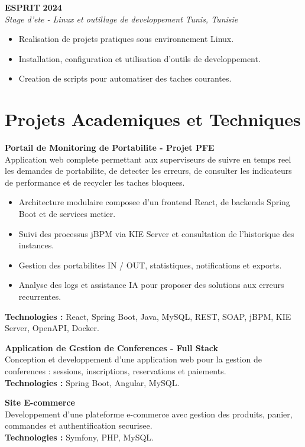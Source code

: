\documentclass[10pt,a4paper]{article}
\newcommand{\entry}[4]{
    \textbf{#1} \hfill \textbf{#2}\\
    \textit{#3} \hfill \textit{#4}\\
}
\begin{document}
\vspace{4pt}
\entry{ESPRIT}{2024}
{Stage d'ete - Linux et outillage de developpement}{Tunis, Tunisie}
\begin{itemize}
    \item Realisation de projets pratiques sous environnement Linux.
    \item Installation, configuration et utilisation d'outils de developpement.
    \item Creation de scripts pour automatiser des taches courantes.
\end{itemize}

\section*{Projets Academiques et Techniques}
\textbf{Portail de Monitoring de Portabilite - Projet PFE}\\
Application web complete permettant aux superviseurs de suivre en temps reel les demandes de portabilite, de detecter les erreurs, de consulter les indicateurs de performance et de recycler les taches bloquees.
\begin{itemize}
    \item Architecture modulaire composee d'un frontend React, de backends Spring Boot et de services metier.
    \item Suivi des processus jBPM via KIE Server et consultation de l'historique des instances.
    \item Gestion des portabilites IN / OUT, statistiques, notifications et exports.
    \item Analyse des logs et assistance IA pour proposer des solutions aux erreurs recurrentes.
\end{itemize}
\textbf{Technologies :} React, Spring Boot, Java, MySQL, REST, SOAP, jBPM, KIE Server, OpenAPI, Docker.

\vspace{4pt}
\textbf{Application de Gestion de Conferences - Full Stack}\\
Conception et developpement d'une application web pour la gestion de conferences : sessions, inscriptions, reservations et paiements.\\
\textbf{Technologies :} Spring Boot, Angular, MySQL.

\vspace{4pt}
\textbf{Site E-commerce}\\
Developpement d'une plateforme e-commerce avec gestion des produits, panier, commandes et authentification securisee.\\
\textbf{Technologies :} Symfony, PHP, MySQL.
\end{document}
